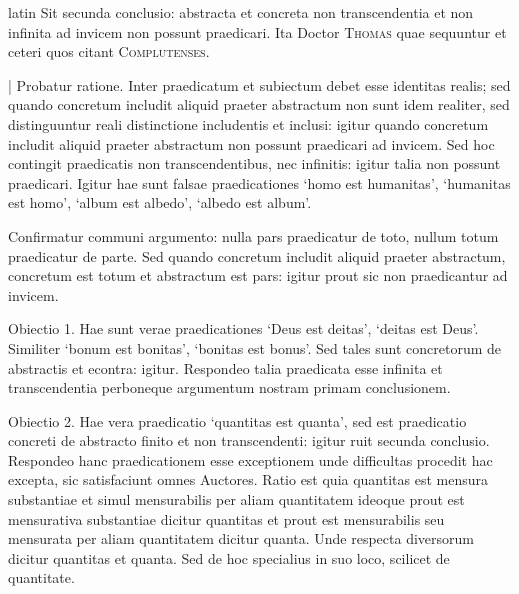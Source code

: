 \begin{otherlanguage*}{latin}
\pstart
Sit secunda conclusio:
abstracta et concreta non transcendentia et non infinita ad invicem non possunt praedicari. Ita Doctor \textsc{Thomas} quae sequuntur   et ceteri quos citant \textsc{Complutenses}\index[persons]{}. 
\pend

\pstart
\textnormal{|} Probatur ratione. Inter praedicatum et subiectum debet esse identitas realis; sed quando concretum includit aliquid praeter abstractum non sunt idem realiter, sed distinguuntur reali distinctione includentis et inclusi:
igitur quando concretum includit aliquid praeter abstractum non possunt praedicari ad invicem. Sed hoc contingit praedicatis non transcendentibus, nec infinitis:
igitur talia non possunt praedicari. Igitur hae sunt falsae praedicationes `homo est humanitas', `humanitas est homo', `album est albedo', `albedo est album'. 
\pend

\pstart
Confirmatur communi argumento:
nulla pars praedicatur de toto, nullum totum praedicatur de parte. Sed quando concretum includit aliquid praeter abstractum, concretum est totum et abstractum est pars:
igitur prout sic non praedicantur ad invicem. 
\pend

\pstart
Obiectio 1. Hae sunt verae praedicationes `Deus est deitas', `deitas est Deus'. Similiter `bonum est bonitas', `bonitas est bonus'. Sed tales sunt concretorum de abstractis et econtra:
igitur. Respondeo talia praedicata esse infinita et transcendentia perboneque argumentum nostram primam conclusionem. 
\pend

\pstart
Obiectio 2. Hae vera praedicatio `quantitas est quanta', sed est praedicatio concreti de abstracto finito et non transcendenti:
igitur ruit secunda conclusio. Respondeo hanc praedicationem esse exceptionem unde difficultas procedit hac excepta, sic satisfaciunt omnes Auctores. Ratio est quia quantitas est mensura substantiae et simul mensurabilis per aliam quantitatem ideoque prout est mensurativa substantiae dicitur quantitas et prout est mensurabilis seu mensurata per aliam quantitatem dicitur quanta. Unde respecta diversorum dicitur quantitas et quanta. Sed de hoc specialius in suo loco, scilicet de quantitate. 
\pend

\pstart
{}
\pend


\end{otherlanguage*}
